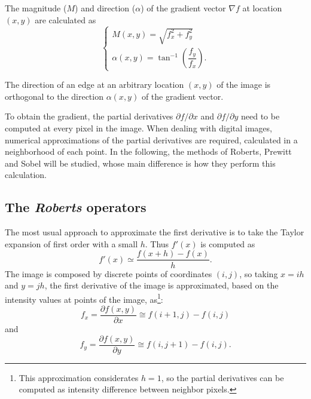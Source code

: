 \documentclass{ipol}
\numberwithin{equation}{section}
\numberwithin{table}{section}
\begin{document}
The magnitude ($M$) and direction ($\alpha$) of the gradient vector $\nabla f$ at location $(x,y)$
are calculated as
\begin{equation}
\label{eq:mag_alpha}
	\begin{cases}
		M(x,y) = \sqrt{f_x^2 + f_y^2} \\
		\alpha(x,y) = \tan^{-1} \left( \dfrac{f_y}{f_x} \right) .
	\end{cases}
\end{equation}

The direction of an edge at an arbitrary location $(x,y)$ of the image is 
orthogonal to the direction $\alpha(x,y)$ of the gradient vector.

To obtain the gradient, the partial derivatives $\partial f/\partial x$ and $\partial f/\partial y$ 
need to be computed at every pixel in the image. When dealing with digital images, numerical approximations 
of the partial derivatives are required, calculated in a neighborhood of each point. In the following,
the methods of Roberts, Prewitt and Sobel will be studied, whose main difference is how they perform this calculation. 


\subsection{The \textit{Roberts} operators}

The most usual approach to approximate the first derivative is to take the Taylor expansion of first order with
a small $h$. Thus $f'(x)$ is computed as
\begin{equation}
	f'(x) \simeq \frac{f(x+h) - f(x)}{h}.
\end{equation}
The image is composed by discrete points of coordinates $(i,j)$, so taking $x=ih$ and $y=jh$, the 
first derivative of the image is approximated, based on the intensity values ​​at points of the image, as\footnote{This approximation considerates $h=1$, so the partial derivatives can be computed as intensity difference between neighbor pixels.}:
\begin{equation}
\label{eq:roberts1}
	f_x = \frac{\partial f(x,y)}{\partial x} \cong f(i+1,j) - f(i,j)
\end{equation}
and
\begin{equation}
\label{eq:roberts2}
	f_y = \frac{\partial f(x,y)}{\partial y} \cong f(i,j+1) - f(i,j).
\end{equation}
\end{document}
